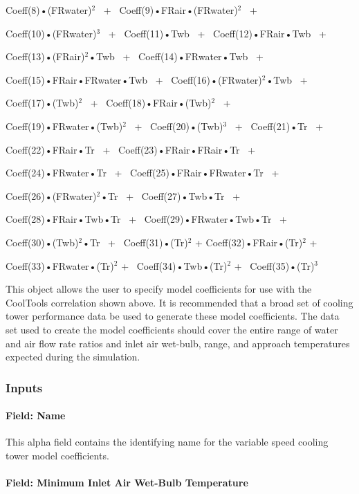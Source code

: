 Coeff(8)•(FRwater)\(^{2}\)~ +~ Coeff(9)•FRair•(FRwater)\(^{2}\)~ +

Coeff(10)•(FRwater)\(^{3}\)~ +~ Coeff(11)•Twb~ +~ Coeff(12)•FRair•Twb~ +

Coeff(13)•(FRair)\(^{2}\)•Twb~ +~ Coeff(14)•FRwater•Twb~ +

Coeff(15)•FRair•FRwater•Twb~ +~ Coeff(16)•(FRwater)\(^{2}\)•Twb~ +

Coeff(17)•(Twb)\(^{2}\)~ +~ Coeff(18)•FRair•(Twb)\(^{2}\)~ +

Coeff(19)•FRwater•(Twb)\(^{2}\)~ +~ Coeff(20)•(Twb)\(^{3}\)~ +~ Coeff(21)•Tr~ +

Coeff(22)•FRair•Tr~ +~ Coeff(23)•FRair•FRair•Tr~ +

Coeff(24)•FRwater•Tr~ +~ Coeff(25)•FRair•FRwater•Tr~ +

Coeff(26)•(FRwater)\(^{2}\)•Tr~ +~ Coeff(27)•Twb•Tr~ +

Coeff(28)•FRair•Twb•Tr~ +~ Coeff(29)•FRwater•Twb•Tr~ +

Coeff(30)•(Twb)\(^{2}\)•Tr~ +~ Coeff(31)•(Tr)\(^{2}\) + Coeff(32)•FRair•(Tr)\(^{2}\) +

Coeff(33)•FRwater•(Tr)\(^{2}\) +~ Coeff(34)•Twb•(Tr)\(^{2}\) +~ Coeff(35)•(Tr)\(^{3}\)

This object allows the user to specify model coefficients for use with the CoolTools correlation shown above. It is recommended that a broad set of cooling tower performance data be used to generate these model coefficients. The data set used to create the model coefficients should cover the entire range of water and air flow rate ratios and inlet air wet-bulb, range, and approach temperatures expected during the simulation.

\subsubsection{Inputs}\label{inputs-4-005}

\paragraph{Field: Name}\label{field-name-3-005}

This alpha field contains the identifying name for the variable speed cooling tower model coefficients.

\paragraph{Field: Minimum Inlet Air Wet-Bulb Temperature}\label{field-minimum-inlet-air-wet-bulb-temperature}

